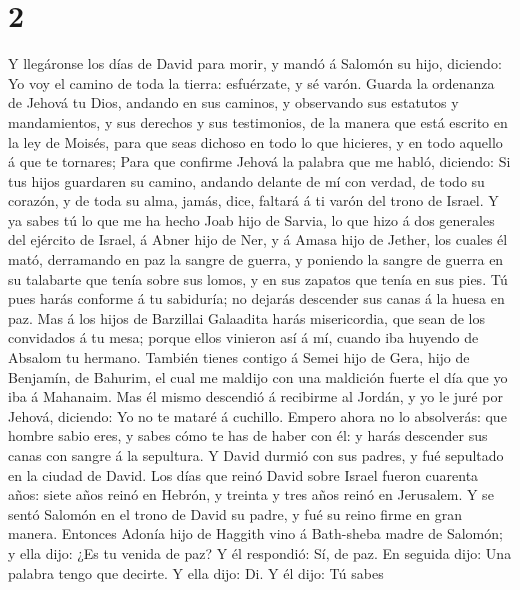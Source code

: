 \hypertarget{section-1}{%
\section{2}\label{section-1}}

 Y llegáronse los días de David para morir, y mandó á
Salomón su hijo, diciendo:  Yo voy el camino de toda la
tierra: esfuérzate, y sé varón.  Guarda la ordenanza de
Jehová tu Dios, andando en sus caminos, y observando sus estatutos y
mandamientos, y sus derechos y sus testimonios, de la manera que está
escrito en la ley de Moisés, para que seas dichoso en todo lo que
hicieres, y en todo aquello á que te tornares;  Para que
confirme Jehová la palabra que me habló, diciendo: Si tus hijos
guardaren su camino, andando delante de mí con verdad, de todo su
corazón, y de toda su alma, jamás, dice, faltará á ti varón del trono de
Israel.  Y ya sabes tú lo que me ha hecho Joab hijo de
Sarvia, lo que hizo á dos generales del ejército de Israel, á Abner hijo
de Ner, y á Amasa hijo de Jether, los cuales él mató, derramando en paz
la sangre de guerra, y poniendo la sangre de guerra en su talabarte que
tenía sobre sus lomos, y en sus zapatos que tenía en sus pies.
 Tú pues harás conforme á tu sabiduría; no dejarás
descender sus canas á la huesa en paz.  Mas á los hijos de
Barzillai Galaadita harás misericordia, que sean de los convidados á tu
mesa; porque ellos vinieron así á mí, cuando iba huyendo de Absalom tu
hermano.  También tienes contigo á Semei hijo de Gera,
hijo de Benjamín, de Bahurim, el cual me maldijo con una maldición
fuerte el día que yo iba á Mahanaim. Mas él mismo descendió á recibirme
al Jordán, y yo le juré por Jehová, diciendo: Yo no te mataré á
cuchillo.  Empero ahora no lo absolverás: que hombre sabio
eres, y sabes cómo te has de haber con él: y harás descender sus canas
con sangre á la sepultura.  Y David durmió con sus
padres, y fué sepultado en la ciudad de David.  Los días
que reinó David sobre Israel fueron cuarenta años: siete años reinó en
Hebrón, y treinta y tres años reinó en Jerusalem.  Y se
sentó Salomón en el trono de David su padre, y fué su reino firme en
gran manera.  Entonces Adonía hijo de Haggith vino á
Bath-sheba madre de Salomón; y ella dijo: ¿Es tu venida de paz? Y él
respondió: Sí, de paz.  En seguida dijo: Una palabra
tengo que decirte. Y ella dijo: Di.  Y él dijo: Tú sabes
